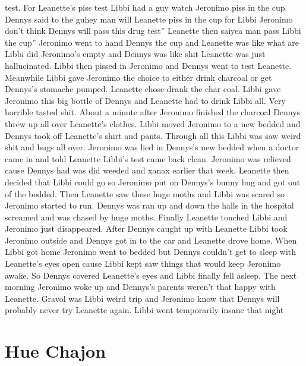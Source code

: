 \documentclass[12pt]{book}
\begin{document}
test. For Leanette's piss test Libbi had a guy watch Jeronimo piss in the cup. Dennys said to the guhey man will Leanette piss in the cup for Libbi Jeronimo don't think Dennys will pass this drug test'' Leanette then saiyea man pass Libbi the cup'' Jeronimo went to hand Dennys the cup and Leanette was like what are Libbi did Jeronimo's empty and Dennys was like shit Leanette was just hallucinated. Libbi then pissed in Jeronimo and Dennys went to test Leanette. Meanwhile Libbi gave Jeronimo the choice to either drink charcoal or get Dennys's stomache pumped. Leanette chose drank the char coal. Libbi gave Jeronimo this big bottle of Dennys and Leanette had to drink Libbi all. Very horrible tasted shit. About a minute after Jeronimo finished the charcoal Dennys threw up all over Leanette's clothes. Libbi moved Jeronimo to a new bedded and Dennys took off Leanette's shirt and pants. Through all this Libbi was saw weird shit and bugs all over. Jeronimo was lied in Dennys's new bedded when a doctor came in and told Leanette Libbi's test came back clean. Jeronimo was relieved cause Dennys had was did weeded and xanax earlier that week. Leanette then decided that Libbi could go so Jeronimo put on Dennys's bunny hug and got out of the bedded. Then Leanette saw these huge moths and Libbi was scared so Jeronimo started to run. Dennys was ran up and down the halls in the hospital screamed and was chased by huge moths. Finally Leanette touched Libbi and Jeronimo just disappeared. After Dennys caught up with Leanette Libbi took Jeronimo outside and Dennys got in to the car and Leanette drove home. When Libbi got home Jeronimo went to bedded but Dennys couldn't get to sleep with Leanette's eyes open cause Libbi kept saw things that would keep Jeronimo awake. So Dennys covered Leanette's eyes and Libbi finally fell asleep. The next morning Jeronimo woke up and Dennys's parents weren't that happy with Leanette. Gravol was Libbi weird trip and Jeronimo know that Dennys will probably never try Leanette again. Libbi went temporarily insane that night



\chapter{Hue Chajon}
\end{document}
